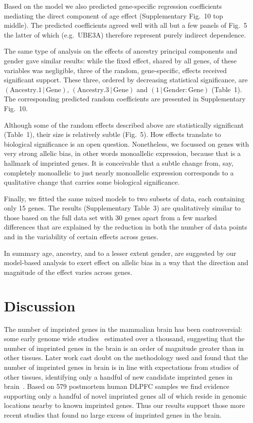 \documentclass[letterpaper]{article}
\begin{document}
Based on the model we also predicted
gene-specific regression coefficients mediating the direct component of age
effect (Supplementary Fig.~10 top middle).  The predicted coefficients
agreed well with all but a few panels of Fig.~5 the latter of
which (e.g.~UBE3A) therefore represent purely indirect dependence.

The same type of analysis on the effects of ancestry principal components and
gender gave similar results: while the fixed effect, shared by all genes, of
these variables was negligible, three of the random, gene-specific, effects
received significant support.  These three, ordered by decreasing
statistical significance, are
\((\mathrm{Ancestry.1}\,|\,\mathrm{Gene})\),
\((\mathrm{Ancestry.3}\,|\,\mathrm{Gene})\) and
\((1\,|\,\mathrm{Gender}:\mathrm{Gene})\) (Table~1).  The
corresponding predicted random coefficients are presented in
Supplementary Fig.~10.

Although some of the random effects described above are statistically
significant (Table~1), their size is relatively subtle (Fig.~5).  How effects
translate to biological significance is an open question.  Nonetheless, we
focussed on genes with very strong allelic bias, in other words monoallelic
expression, because that is a hallmark of imprinted genes.  It is conceivable
that a subtle change from, say, completely monoallelic to just nearly
monoallelic expression corresponds to a qualitative change that carries some
biological significance.

Finally, we fitted the same mixed models to two subsets of data, each
containing only 15 genes.  The results (Supplementary Table~3) are
qualitatively similar to those based on the full data set with 30 genes apart
from a few marked differences that are explained by the reduction in both the
number of data points and in the variability of certain effects across genes.

In summary age, ancestry, and to a lesser extent gender, are suggested by our
model-based analysis to exert effect on allelic bias in a way that the
direction and magnitude of the effect varies across genes.

\section*{Discussion}

The number of imprinted genes in the mammalian brain has been controversial:
some early genome wide studies~\cite{Gregg2010a,Gregg2010} estimated over a
thousand, suggesting that the number of imprinted genes in the brain is an
order of magnitude greater than in other tissues.  Later work cast doubt on
the methodology used and found that the number of imprinted genes in brain is
in line with expectations from studies of other tissues, identifying only a
handful of new candidate imprinted genes in brain~\cite{Baran2015,DeVeale2012,Perez2015}.
Based on 579 postmortem human DLPFC
samples we find evidence supporting only a handful of novel imprinted genes
all of which reside in genomic locations nearby to known imprinted genes.
Thus our results support those more recent studies that found no large excess
of imprinted genes in the brain.
\end{document}
